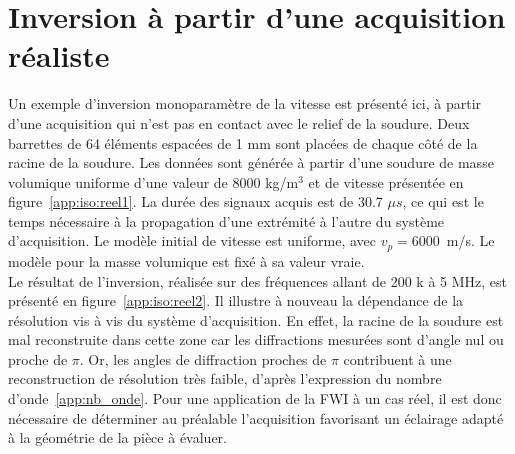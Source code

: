 
\chapter{Inversion à partir d'une acquisition réaliste \label{annexe:acqui}}
Un exemple d'inversion monoparamètre de la vitesse est présenté ici, à partir d'une acquisition qui n'est pas en contact avec le relief de la soudure. Deux barrettes de 64 éléments espacées de 1 mm sont placées de chaque côté de la racine de la soudure. Les données sont générée à partir d'une soudure de masse volumique uniforme d'une valeur de 8000 kg/m$^{3}$ et de vitesse présentée en figure~\ref{app:iso:reel1}. La durée des signaux acquis est de 30.7 $\mu s$, ce qui est le temps nécessaire à la propagation d'une extrémité à l'autre du système d'acquisition. Le modèle initial de vitesse est uniforme, avec $v_{p}=6000$~m/s. Le modèle pour la masse volumique est fixé à sa valeur vraie.\\

 Le résultat de l'inversion, réalisée sur des fréquences allant de 200 k à 5 MHz, est présenté en figure~\ref{app:iso:reel2}. Il illustre à nouveau la dépendance de la résolution vis à vis du système d'acquisition. En effet, la racine de la soudure est mal reconstruite dans cette zone car les diffractions mesurées sont d'angle nul ou proche de $\pi$. Or, les angles de diffraction proches de $\pi$  contribuent à une reconstruction de résolution très faible, d'après l'expression du nombre d'onde~\ref{app:nb_onde}. Pour une application de la FWI à un cas réel, il est donc nécessaire de déterminer au préalable l'acquisition favorisant un éclairage adapté à la géométrie de la pièce à évaluer.
 
